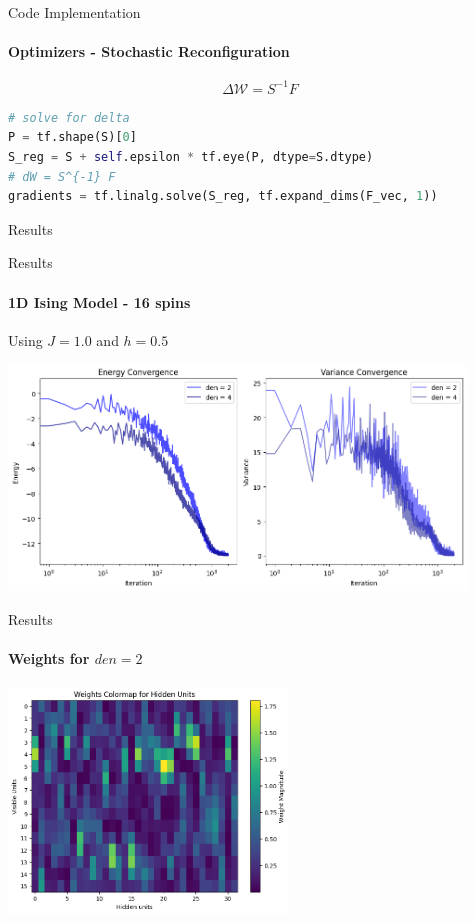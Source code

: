 \documentclass{beamer}
\begin{document}
\begin{frame}[fragile]{Code Implementation}
\framesubtitle{Optimizers - Stochastic Reconfiguration}
$$\Delta \mathcal{W} = S^{-1} F$$

\begin{lstlisting}[language=Python, style=kaolstplain]
# solve for delta
P = tf.shape(S)[0]
S_reg = S + self.epsilon * tf.eye(P, dtype=S.dtype)
# dW = S^{-1} F
gradients = tf.linalg.solve(S_reg, tf.expand_dims(F_vec, 1))
\end{lstlisting}
\end{frame}

\begin{chapter}{}{Results}
\end{chapter}

\begin{frame}{Results}
\framesubtitle{1D Ising Model - 16 spins}
Using $J = 1.0$ and $h=0.5$
\begin{center}
\includegraphics[height=6cm]{images/16spin_history_j1.png}
\end{center}
\end{frame}

\begin{frame}{Results}
\framesubtitle{Weights for $den = 2$}
\begin{center}
\includegraphics[height=6cm]{images/16spin_den2_j1.png}
\end{center}
\end{frame}
\end{document}
